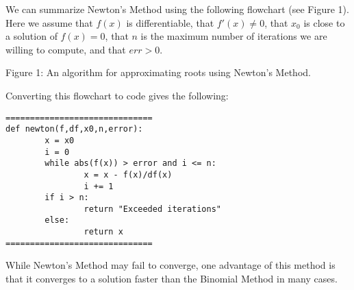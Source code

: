 \documentclass{ximera}
\begin{document}
We can summarize Newton's Method using the following flowchart (see Figure 1). Here we assume that $f(x)$ is differentiable, that $f'(x)\neq 0$, that $x_0$ is close to a solution of $f(x)=0$, that $n$ is the maximum number of iterations we are willing to compute, and that $err>0$.

\begin{center}
\end{center}
\begin{center}
	Figure 1: An algorithm for approximating roots using Newton's Method.
\end{center}

Converting this flowchart to code gives the following:

\begin{verbatim}
==============================
def newton(f,df,x0,n,error):
        x = x0
        i = 0
        while abs(f(x)) > error and i <= n:
                x = x - f(x)/df(x)
                i += 1
        if i > n:
                return "Exceeded iterations"
        else:
                return x
==============================
\end{verbatim}

While Newton's Method may fail to converge, one advantage of this method is that it converges to a solution faster than the Binomial Method in many cases.
\end{document}

